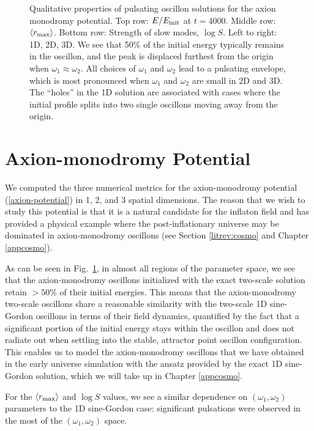 \documentclass{report}
\begin{document}
\begin{figure}[p]
\begin{adjustwidth}{-1in}{-1in}
    \caption{Qualitative properties of pulsating oscillon solutions for the axion monodromy potential. Top row: $E/E_{\rm init}$ at $t=4000$.
      Middle row: $\langle r_{\rm max}\rangle$.
      Bottom row: Strength of slow modes, $\log{S}$.\quad
      Left to right: 1D, 2D, 3D. We see that 50\% of the initial energy typically remains in the oscillon, and the peak is displaced furthest from the origin when $\omega_1 \approx \omega_2$. All choices of  $\omega_1$ and $\omega_2$ lead to a pulsating envelope, which is most pronounced when $\omega_1$ and $\omega_2$ are small in 2D and 3D. The ``holes'' in the 1D solution are associated with cases where the initial profile splits into two single oscillons moving away from the origin.}\label{axion-monodromy}
  \end{adjustwidth}
\end{figure}

\section{Axion-monodromy Potential}
We computed the three numerical metrics for the axion-monodromy potential (\ref {axion-potential}) in 1, 2, and 3 spatial dimensions. The reason that we wish to study this potential is that it is a natural candidate for the inflaton field and has provided a physical example where the post-inflationary universe may be dominated in axion-monodromy oscillons (see Section \ref{litrev:cosmo} and Chapter \ref{appcosmo}). 

As can be seen in Fig.~\ref{axion-monodromy}, in almost all regions of the parameter space, we see that the axion-monodromy oscillons initialized with the exact two-scale solution retain $>50\%$ of their initial energies. This means that the axion-monodromy two-scale oscillons share a reasonable similarity with the two-scale 1D sine-Gordon oscillons in terms of their field dynamics, quantified by the fact that a significant portion of the initial energy stays within the oscillon and does not radiate out when settling into the stable, attractor point oscillon configuration. This enables us to model the axion-monodromy oscillons that we have obtained in the early universe simulation with the ansatz provided by the exact 1D sine-Gordon solution, which we will take up in Chapter \ref{appcosmo}.

For the $\langle r_{\rm max}\rangle$ and $\log S$ values, we see a similar dependence on $(\omega_1,\omega_2)$ parameters to the 1D sine-Gordon case: significant pulsations were observed in the most of the $(\omega_1,\omega_2)$ space.
 
\end{document}
